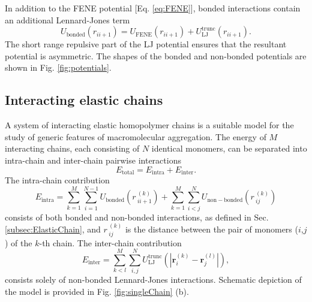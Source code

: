 \documentclass[12pt]{report}
\begin{document}
%
In addition to the FENE potential [Eq.\,\,\ref{eq:FENE}], bonded interactions contain an additional Lennard-Jones term
%
\begin{equation}
U_{\mathrm{bonded}}(r_{ii+1})= U_{\mathrm{FENE}}(r_{ii+1}) +  U_{\mathrm{LJ}}^{\mathrm{trunc}}(r_{ii+1}).
\end{equation}
%
The short range repulsive part of the LJ potential ensures that the resultant potential is asymmetric. The shapes of the bonded and non-bonded potentials are shown in Fig. \ref{fig:potentials}. 


\subsection{Interacting elastic chains}
A system of interacting elastic homopolymer chains is a suitable model for the study of generic features of macromolecular aggregation. The energy of $M$ interacting chains, each consisting of $N$ identical monomers, can be separated into intra-chain and inter-chain pairwise interactions
%
\begin{equation}
E_{\mathrm{total}} = E_{\mathrm{intra}} + E_{\mathrm{inter}}.
\end{equation}
%
The intra-chain contribution 
\begin{equation}
E_{\mathrm{intra}} = \sum^{M}_{k = 1}\sum^{N-1}_{i = 1}
U_{\mathrm{bonded}}(r\,^{(k)}_{ii+1}) +
\sum^{M}_{k=1}\sum^{N}_{i<j}
U_{\mathrm{non-bonded}}(r\,^{(k)}_{ij})
\end{equation}
%
consists of both bonded and non-bonded interactions, as defined in Sec.\,\,\ref{subsec:ElasticChain}, and $r\,^{(k)}_{ij}$ is the distance between the pair of monomers ($i$,$j$) of the $k$-th chain. The inter-chain contribution
\begin{equation}
E_{\mathrm{inter}} = \sum^{M}_{k < l}
\sum^{N}_{i,j}U_{\mathrm{LJ}}^{\mathrm{trunc}}(|\textbf{r}^{(k)}_{i}
- \textbf{r}^{(l)}_{j}|),
\end{equation}
%
consists solely of non-bonded Lennard-Jones interactions. Schematic depiction of the model is provided in Fig.\,\,\ref{fig:singleChain}\,\,(b).

\end{document}
